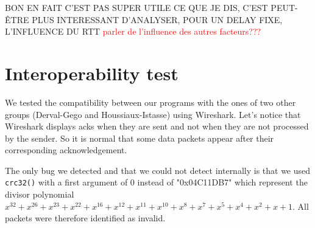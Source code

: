 \documentclass[11pt,a4paper]{article}
\begin{document}
BON EN FAIT C'EST PAS SUPER UTILE CE QUE JE DIS, C'EST PEUT-ÊTRE PLUS INTERESSANT D'ANALYSER, POUR UN DELAY FIXE, L'INFLUENCE DU RTT
\textcolor{red}{parler de l'influence des autres facteurs???}

\section{Interoperability test }

We tested the compatibility between our programs with the ones of two other groups (Derval-Gego and Houssiaux-Istasse) using Wireshark. Let's notice that Wireshark displays acks when they are sent and not when they are not processed by the sender. So it is normal that some data packets appear after their corresponding acknowledgement.

The only bug we detected and that we could not detect internally is that we used \texttt{crc32()} with a first argument of $0$ instead of "0x04C11DB7" which represent the divisor polynomial $x^{32} +x^{26} +x^{23} +x^{22} +x^{16} +x^{12} +x^{11} +x^{10} +x^{8} + x^{7} + x^{5} + x^{4} + x^{2} + x + 1$. All packets were therefore identified as invalid.
 
\end{document}
